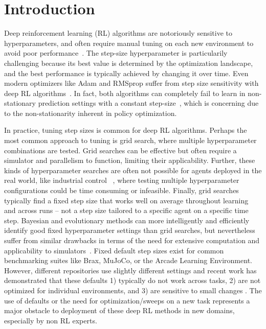 \documentclass[10pt]{article} %
\begin{document}
\section{Introduction}

Deep reinforcement learning (RL) algorithms are notoriously sensitive to hyperparameters, and often require manual
tuning on each new environment to avoid poor performance~\citep{eimer2023hyperparameters,adkins2024method}. The step-size hyperparameter is particularily challenging because its best value is determined by the optimization landscape, and the best performance is typically achieved by changing it over time. Even modern optimizers like Adam and RMSprop suffer from step size
sensitivity with deep RL algorithms~\citep{ellis2024adam,donancio2024dynamic,jordan2024cliff}. In fact, both algorithms can completely fail to learn in non-stationary prediction settings with a constant step-size~\citep{jacobsen2019meta,degris2024step}, which is concerning due to the non-stationarity inherent in policy optimization. 

In practice, tuning step sizes is common for deep RL algorithms. Perhaps the most common
approach to tuning is grid search, where multiple hyperparameter combinations are tested. Grid searches can be
effective but often require a simulator and parallelism to function, limiting their applicability. Further, these kinds of hyperparameter searches are
often not possible for agents deployed in the real world, like industrial control ~\citep{luo2022controlling,janjua2024gvfs}, where testing multiple
hyperparameter configurations could be time consuming or infeasible. Finally, grid searches typically find a fixed step size that
works well on average throughout learning and across runs -- not a step size tailored to a specific agent on a specific time step.
Bayesian and evolutionary methods can more intelligently and efficiently identify good fixed hyperparameter settings than
grid searches, but nevertheless suffer from similar drawbacks in terms of the need for extensive computation and applicability to simulators~\citep{parker2022automated}. Fixed default step sizes exist for common
benchmarking suites like Brax, MuJoCo, or the Arcade Learning Environment. However, different repositories use slightly different settings and recent work has demonstrated that these
defaults 1) typically do not work across tasks, 2) are not optimized for individual environments, and 3) are sensitive to
small changes \citep{patterson2024chtb,adkins2024method,eimer2023hyperparameters}. The use of defaults or the need for optimization/sweeps on a new task represents a major obstacle to deployment of these deep RL methods in new domains, especially by non RL experts.
\end{document}
